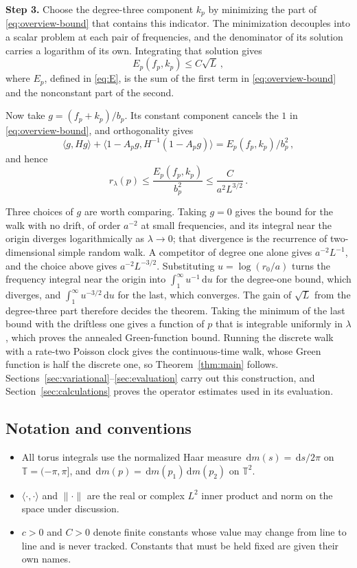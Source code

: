 \documentclass[11pt]{amsart}
\theoremstyle{plain}
\theoremstyle{definition}
\newcommand{\T}{\mathbb T}
\newcommand{\1}{\mathbf 1}
\newcommand{\ip}[2]{\langle #1,#2\rangle}
\newcommand{\norm}[1]{\lVert #1\rVert}
\newcommand{\dd}{\,\mathrm d}
\begin{document}
\medskip

\noindent\textbf{Step 3.}  Choose the degree-three component $k_p$ by
minimizing the part of \eqref{eq:overview-bound} that contains this
indicator.  The minimization decouples into a scalar problem at each pair of
frequencies, and the denominator of its solution carries a logarithm of its
own.  Integrating that solution gives
\begin{equation}\label{eq:overview-estimates}
  E_p(f_p,k_p)\leq C\sqrt L\, ,
\end{equation}
where $E_p$, defined in \eqref{eq:E}, is the sum of the first term in
\eqref{eq:overview-bound} and the nonconstant part of the second.

Now take $g=(f_p+k_p)/b_p$.  Its constant component cancels the $1$ in
\eqref{eq:overview-bound}, and orthogonality gives
\[
  \ip g{Hg}+\ip{1-A_pg}{H^{-1}(1-A_pg)}
  =E_p(f_p,k_p)/b_p^2\, ,
\]
and hence
\[
  r_\lambda(p)\leq\frac{E_p(f_p,k_p)}{b_p^2}
  \leq\frac C{a^2L^{3/2}}\, .
\]

Three choices of $g$ are worth comparing.  Taking $g=0$ gives the bound for
the walk with no drift, of order $a^{-2}$ at small frequencies, and its
integral near the origin diverges logarithmically as $\lambda\to0$; that
divergence is the recurrence of two-dimensional simple random walk.  A
competitor of degree one alone gives $a^{-2}L^{-1}$, and the choice above
gives $a^{-2}L^{-3/2}$.  Substituting $u=\log(r_0/a)$ turns the frequency
integral near the origin into $\int_1^\infty u^{-1}\dd u$ for the degree-one
bound, which diverges, and $\int_1^\infty u^{-3/2}\dd u$ for the last, which
converges.  The gain of $\sqrt L$ from the degree-three part therefore decides
the theorem.  Taking the minimum of the last bound with the driftless one
gives a function of $p$ that is integrable uniformly in $\lambda$, which
proves the annealed Green-function bound.  Running the discrete walk with a
rate-two Poisson clock gives the continuous-time walk, whose Green function is
half the discrete one, so Theorem~\ref{thm:main} follows.
Sections~\ref{sec:variational}--\ref{sec:evaluation} carry out this
construction, and Section~\ref{sec:calculations} proves the
operator estimates used in its evaluation.

\subsection{Notation and conventions}\label{ssec:notation}

\begin{itemize}
\item All torus integrals use the normalized Haar measure
$\dd m(s)=\dd s/2\pi$ on $\T=(-\pi,\pi]$, and $\dd m(p)=\dd m(p_1)\dd m(p_2)$
on $\T^2$.
\item $\ip\cdot\cdot$ and $\norm\cdot$ are the real or complex $L^2$ inner
product and norm on the space under discussion.
\item $c>0$ and $C>0$ denote finite constants whose value may change from
line to line and is never tracked.  Constants that must be held fixed are
given their own names.
\end{itemize}
\end{document}
